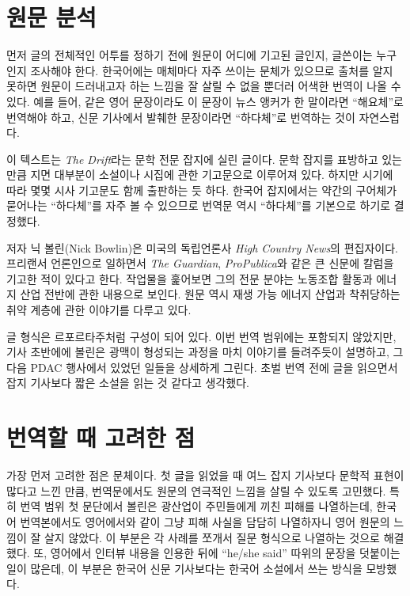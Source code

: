 \documentclass{translation}
\begin{document}
\section{원문 분석}

먼저 글의 전체적인 어투를 정하기 전에 원문이 어디에 기고된 글인지, 글쓴이는 누구인지 조사해야 한다.
한국어에는 매체마다 자주 쓰이는 문체가 있으므로 출처를 알지 못하면 원문이 드러내고자 하는 느낌을 잘 살릴 수 없을 뿐더러 어색한 번역이 나올 수 있다.
예를 들어, 같은 영어 문장이라도 이 문장이 뉴스 앵커가 한 말이라면 ``해요체''로 번역해야 하고, 신문 기사에서 발췌한 문장이라면 ``하다체''로 번역하는 것이 자연스럽다.

이 텍스트는 \textit{The Drift}라는 문학 전문 잡지에 실린 글이다.
문학 잡지를 표방하고 있는 만큼 지면 대부분이 소설이나 시집에 관한 기고문으로 이루어져 있다.
하지만 시기에 따라 몇몇 시사 기고문도 함께 출판하는 듯 하다.
한국어 잡지에서는 약간의 구어체가 묻어나는 ``하다체''를 자주 볼 수 있으므로 번역문 역시 ``하다체''를 기본으로 하기로 결정했다.

저자 닉 볼린(Nick Bowlin)은 미국의 독립언론사 \textit{High Country News}의 편집자이다.
프리랜서 언론인으로 일하면서 \textit{The Guardian}, \textit{ProPublica}와 같은 큰 신문에 칼럼을 기고한 적이 있다고 한다.
작업물을 훑어보면 그의 전문 분야는 노동조합 활동과 에너지 산업 전반에 관한 내용으로 보인다.
원문 역시 재생 가능 에너지 산업과 착취당하는 취약 계층에 관한 이야기를 다루고 있다.

글 형식은 르포르타주처럼 구성이 되어 있다.
이번 번역 범위에는 포함되지 않았지만, 기사 초반에에 볼린은 광맥이 형성되는 과정을 마치 이야기를 들려주듯이 설명하고, 그 다음 PDAC 행사에서 있었던 일들을 상세하게 그린다.
초벌 번역 전에 글을 읽으면서 잡지 기사보다 짧은 소설을 읽는 것 같다고 생각했다.

\section{번역할 때 고려한 점}

가장 먼저 고려한 점은 문체이다.
첫 글을 읽었을 때 여느 잡지 기사보다 문학적 표현이 많다고 느낀 만큼, 번역문에서도 원문의 연극적인 느낌을 살릴 수 있도록 고민했다.
특히 번역 범위 첫 문단에서 볼린은 광산업이 주민들에게 끼친 피해를 나열하는데, 한국어 번역본에서도 영어에서와 같이 그냥 피해 사실을 담담히 나열하자니 영어 원문의 느낌이 잘 살지 않았다.
이 부분은 각 사례를 쪼개서 질문 형식으로 나열하는 것으로 해결했다.
또, 영어에서 인터뷰 내용을 인용한 뒤에 ``he/she said'' 따위의 문장을 덧붙이는 일이 많은데, 이 부분은 한국어 신문 기사보다는 한국어 소설에서 쓰는 방식을 모방했다.
\end{document}
